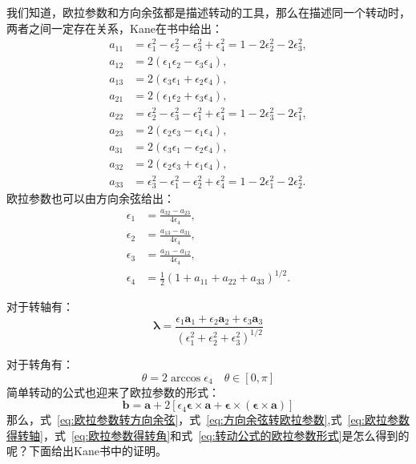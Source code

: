 我们知道，欧拉参数和方向余弦都是描述转动的工具，那么在描述同一个转动时，两者之间一定存在关系，Kane在书中给出：
\begin{equation}
    \begin{aligned}
        a_{11} &= \epsilon_1^2 - \epsilon_2^2 - \epsilon_3^2 + \epsilon_4^2 = 1 - 2\epsilon_2^2 - 2\epsilon_3^2,\\
        a_{12} &= 2(\epsilon_1 \epsilon_2 - \epsilon_3 \epsilon_4),\\
        a_{13} &= 2(\epsilon_3 \epsilon_1 + \epsilon_2 \epsilon_4),\\
        a_{21} &= 2(\epsilon_1 \epsilon_2 + \epsilon_3 \epsilon_4),\\
        a_{22} &= \epsilon_2^2 - \epsilon_3^2 - \epsilon_1^2 + \epsilon_4^2 = 1 - 2\epsilon_3^2 - 2\epsilon_1^2,\\
        a_{23} &= 2(\epsilon_2 \epsilon_3 - \epsilon_1 \epsilon_4),\\
        a_{31} &= 2(\epsilon_3 \epsilon_1 - \epsilon_2 \epsilon_4),\\
        a_{32} &= 2(\epsilon_2 \epsilon_3 + \epsilon_1 \epsilon_4),\\
        a_{33} &= \epsilon_3^2 - \epsilon_1^2 - \epsilon_2^2 + \epsilon_4^2 = 1 - 2\epsilon_1^2 - 2\epsilon_2^2.
    \end{aligned}
    \label{eq:欧拉参数转方向余弦}
\end{equation}
欧拉参数也可以由方向余弦给出：
\begin{equation}
    \begin{aligned}
        \epsilon_{1} &= \frac{a_{32}-a_{23}}{4\epsilon_4},\\
        \epsilon_{2} &= \frac{a_{13}-a_{31}}{4\epsilon_4},\\
        \epsilon_{3} &= \frac{a_{21}-a_{12}}{4\epsilon_4},\\
        \epsilon_4 &= \frac{1}{2}\left(1+a_{11}+a_{22}+a_{33}\right)^{1/2}.
    \end{aligned}
    \label{eq:方向余弦转欧拉参数}
\end{equation}

对于转轴有：
\begin{equation}
    \boldsymbol{\lambda}=\frac{\epsilon_1\mathbf{a}_1+\epsilon_2\mathbf{a}_2+\epsilon_3\mathbf{a}_3}{(\epsilon_1^2+\epsilon_2^2+\epsilon_3^2)^{1/2}}
    \label{eq:欧拉参数得转轴}
\end{equation}

对于转角有：
\begin{equation}
    \theta=2\arccos\epsilon_4 \quad \theta \in [0,\pi]
    \label{eq:欧拉参数得转角}
\end{equation}
简单转动的公式也迎来了欧拉参数的形式：
\begin{equation}
    \mathbf{b}=\mathbf{a}+2[\epsilon_4 \boldsymbol{\epsilon}\times\mathbf{a}+\boldsymbol{\epsilon}\times(\boldsymbol{\epsilon}\times\mathbf{a})]
    \label{eq:转动公式的欧拉参数形式}
\end{equation}
那么，式~\eqref{eq:欧拉参数转方向余弦}，式~\eqref{eq:方向余弦转欧拉参数},式~\eqref{eq:欧拉参数得转轴}，式~\eqref{eq:欧拉参数得转角}和式~\eqref{eq:转动公式的欧拉参数形式}是怎么得到的呢？下面给出Kane书中的证明。

